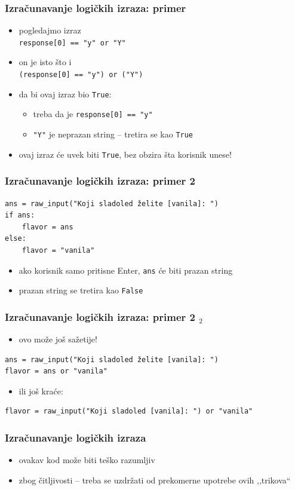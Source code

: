 \documentclass[utf8,compress]{beamer}
\begin{document}
\begin{frame}[fragile]
  \frametitle{Izračunavanje logičkih izraza: primer}
  \begin{itemize}
    \item pogledajmo izraz \\
      \texttt{response[0] == "y" or "Y"}
    \item on je isto što i \\
      \texttt{(response[0] == "y") or ("Y")}
    \item da bi ovaj izraz bio \texttt{True}:
    \begin{itemize}
      \item treba da je \texttt{response[0] == "y"}
      \item \texttt{"Y"} je neprazan string -- tretira se kao \texttt{True}
    \end{itemize}
    \item ovaj izraz će uvek biti \texttt{True}, bez obzira šta korisnik unese!
  \end{itemize}
\end{frame}

\begin{frame}[fragile]
  \frametitle{Izračunavanje logičkih izraza: primer 2}
\begin{verbatim}
ans = raw_input("Koji sladoled želite [vanila]: ")
if ans:
    flavor = ans
else:
    flavor = "vanila"
\end{verbatim}
  \begin{itemize}
    \item ako korisnik samo pritisne Enter, \texttt{ans} će biti prazan string
    \item prazan string se tretira kao \texttt{False}
  \end{itemize}
\end{frame}

\begin{frame}[fragile,shrink=5]
  \frametitle{Izračunavanje logičkih izraza: primer 2 $_2$}
  \begin{itemize}
    \item ovo može još sažetije!
  \end{itemize}
\begin{verbatim}
ans = raw_input("Koji sladoled želite [vanila]: ")
flavor = ans or "vanila"
\end{verbatim}
  \begin{itemize}
    \item ili još kraće:
  \end{itemize}
\begin{verbatim}
flavor = raw_input("Koji sladoled [vanila]: ") or "vanila"
\end{verbatim}
\end{frame}

\begin{frame}[fragile]
  \frametitle{Izračunavanje logičkih izraza}
  \begin{itemize}
    \item ovakav kod može biti teško razumljiv
    \item zbog čitljivosti -- treba se uzdržati od prekomerne upotrebe ovih ,,trikova``
  \end{itemize}
\end{frame}
\end{document}
